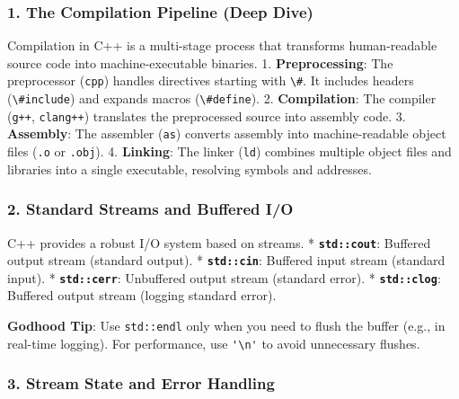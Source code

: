 \hypertarget{the-compilation-pipeline-deep-dive}{%
\subsubsection{1. The Compilation Pipeline (Deep
Dive)}\label{the-compilation-pipeline-deep-dive}}

Compilation in C++ is a multi-stage process that transforms
human-readable source code into machine-executable binaries. 1.
\textbf{Preprocessing}: The preprocessor (\passthrough{\lstinline!cpp!})
handles directives starting with \passthrough{\lstinline!\#!}. It
includes headers (\passthrough{\lstinline!\#include!}) and expands
macros (\passthrough{\lstinline!\#define!}). 2. \textbf{Compilation}:
The compiler (\passthrough{\lstinline!g++!},
\passthrough{\lstinline!clang++!}) translates the preprocessed source
into assembly code. 3. \textbf{Assembly}: The assembler
(\passthrough{\lstinline!as!}) converts assembly into machine-readable
object files (\passthrough{\lstinline!.o!} or
\passthrough{\lstinline!.obj!}). 4. \textbf{Linking}: The linker
(\passthrough{\lstinline!ld!}) combines multiple object files and
libraries into a single executable, resolving symbols and addresses.

\hypertarget{standard-streams-and-buffered-io}{%
\subsubsection{2. Standard Streams and Buffered
I/O}\label{standard-streams-and-buffered-io}}

C++ provides a robust I/O system based on streams. *
\textbf{\passthrough{\lstinline!std::cout!}}: Buffered output stream
(standard output). * \textbf{\passthrough{\lstinline!std::cin!}}:
Buffered input stream (standard input). *
\textbf{\passthrough{\lstinline!std::cerr!}}: Unbuffered output stream
(standard error). * \textbf{\passthrough{\lstinline!std::clog!}}:
Buffered output stream (logging standard error).

\textbf{Godhood Tip}: Use \passthrough{\lstinline!std::endl!} only when
you need to flush the buffer (e.g., in real-time logging). For
performance, use \passthrough{\lstinline!'\\n'!} to avoid unnecessary
flushes.

\hypertarget{stream-state-and-error-handling}{%
\subsubsection{3. Stream State and Error
Handling}\label{stream-state-and-error-handling}}

